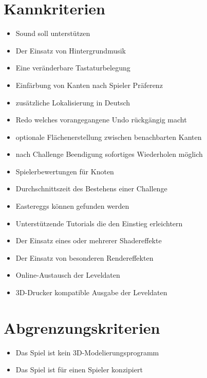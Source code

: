 \section{Kannkriterien}


\begin{itemize}
\item Sound soll unterstützen

\item Der Einsatz von Hintergrundmusik

\item Eine veränderbare Tastaturbelegung

\item Einfärbung von Kanten nach Spieler Präferenz

\item zusätzliche Lokalisierung in Deutsch

\item Redo welches vorangegangene Undo rückgängig macht

\item optionale Flächenerstellung zwischen benachbarten Kanten

\item nach Challenge Beendigung sofortiges Wiederholen möglich

\item Spielerbewertungen für Knoten

\item Durchschnittszeit des Bestehens einer Challenge

\item Eastereggs können gefunden werden

\item Unterstützende Tutorials die den Einstieg erleichtern
	
\item Der Einsatz eines oder mehrerer Shadereffekte

\item Der Einsatz von besonderen Rendereffekten 

\item Online-Austausch der Leveldaten

\item 3D-Drucker kompatible Ausgabe der Leveldaten
\end{itemize}

\section{Abgrenzungskriterien}


\begin{itemize}



\item Das Spiel ist kein 3D-Modelierungsprogramm

\item Das Spiel ist für einen Spieler konzipiert

\end{itemize}